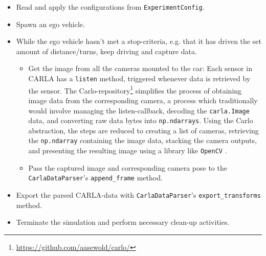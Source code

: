 \begin{itemize}
    \item Read and apply the configurations from \texttt{ExperimentConfig}.
    \item Spawn an ego vehicle.
    \item While the ego vehicle hasn’t met a stop-criteria, e.g. that it has driven the set amount of distance/turns, keep driving and capture data.
    \begin{itemize}
        \item Get the image from all the cameras mounted to the car: Each sensor in CARLA has a \texttt{listen} method, triggered whenever data is retrieved by the sensor. The Carlo-repository\footnote{\url{https://github.com/aasewold/carlo/}} simplifies the process of obtaining image data from the corresponding camera, a process which traditionally would involve managing the listen-callback, decoding the \texttt{carla.Image} data, and converting raw data bytes into \texttt{np.ndarrays}. Using the Carlo abstraction, the steps are reduced to creating a list of cameras, retrieving the \texttt{np.ndarray} containing the image data, stacking the camera outputs, and presenting the resulting image using a library like \texttt{OpenCV} \cite{opencv_library}.
        \item Pass the captured image and corresponding camera pose to the \texttt{CarlaDataParser}'s \texttt{append\_frame} method.
    \end{itemize}
    \item Export the parsed CARLA-data with \texttt{CarlaDataParser}'s \texttt{export\_transforms} method.
    \item Terminate the simulation and perform necessary clean-up activities.
\end{itemize}


